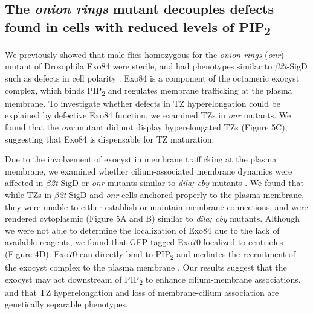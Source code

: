 \documentclass[12pt, twoside, letterpaper]{article}
\newcommand{\PIP}{PIP\textsubscript{2}}
\newcommand{\sigd}{$\beta$\textit{2t}-SigD}
\begin{document}
\begin{doublespacing}
\begin{linenumbers}
    \subsection{The \textit{onion rings} mutant decouples defects found in cells with reduced levels of \PIP{}}
    We previously showed that male flies homozygous for the \textit{onion rings}
    (\textit{onr}) mutant of Drosophila Exo84 were sterile, and had phenotypes
    similar to \sigd{} such as defects in cell polarity \citep{wei2008depletion}.
    Exo84 is a component of the octameric exocyst complex, which binds
    \PIP{} and regulates membrane trafficking at the plasma membrane.
    To investigate whether defects in TZ hyperelongation could be explained by
    defective Exo84 function, we examined TZs in \textit{onr} mutants.
    We found that the \textit{onr} mutant did not display hyperelongated TZs (Figure 5C),
    suggesting that Exo84 is dispensable for TZ maturation.

    Due to the involvement of exocyst in membrane trafficking at the plasma membrane,
    we examined whether cilium-associated membrane dynamics were affected in \sigd{}
    or \textit{onr} mutants similar to \textit{dila; cby} mutants
    \citep{vieillard2016transition}.
    We found that while TZs in \sigd{} and \textit{onr} cells anchored properly
    to the plasma membrane, they were unable to either establish or maintain
    membrane connections, and were rendered cytoplasmic (Figure 5A and B) similar to
    \textit{dila; cby} mutants.
    Although we were not able to determine the localization of Exo84 due to the
    lack of available reagents,
    we found that GFP-tagged Exo70 localized to centrioles (Figure 4D).
    Exo70 can directly bind to \PIP{} and mediates the recruitment of
    the exocyst complex to the plasma membrane \citep{he2007exo70}.
    Our results suggest that the exocyst may act downstream of \PIP{} to
    enhance cilium-membrane associations, and that TZ hyperelongation and loss of
    membrane-cilium association are genetically separable phenotypes.


\end{linenumbers}
\end{doublespacing}
\end{document}
